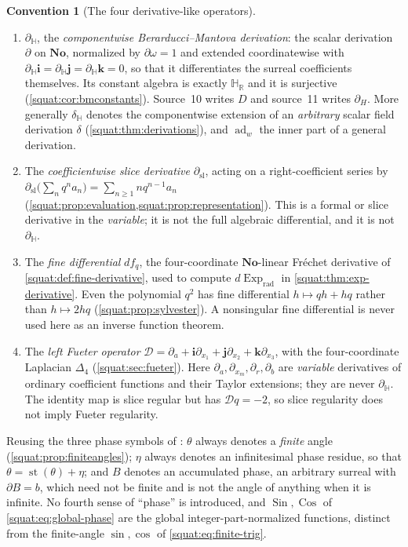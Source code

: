 \documentclass[11pt,letterpaper]{article}
\numberwithin{equation}{section}
\theoremstyle{definition}
\newtheorem{convention}[convention]{Convention}
\theoremstyle{remark}
\newcommand{\No}{\mathbf{No}}
\newcommand{\HR}{\mathbb H_{\mathbb R}}
\newcommand{\ii}{\mathbf i}
\newcommand{\jj}{\mathbf j}
\newcommand{\kk}{\mathbf k}
\newcommand{\st}{\operatorname{st}}
\newcommand{\ad}{\operatorname{ad}}
\newcommand{\Exp}{\operatorname{Exp}}
\newcommand{\Expr}{\Exp_{\mathrm{rad}}}
\newcommand{\Sin}{\operatorname{Sin}}
\newcommand{\Cos}{\operatorname{Cos}}
\newcommand{\DD}{\mathcal D}
\newcommand{\dsl}{\partial_{\mathrm{sl}}}
\newcommand{\dH}{\partial_{\mathbb H}}
\newcommand{\delH}{\delta_{\mathbb H}}
\begin{document}
\begin{convention}[The four derivative-like operators]\label{squat:conv:derivs}
\begin{enumerate}[label=\textup{(\alph*)},leftmargin=2.4em]
\item $\dH$, the \emph{componentwise Berarducci--Mantova derivation}: the scalar
derivation $\partial$ on $\No$, normalized by $\partial\omega=1$ and extended
coordinatewise with $\dH\ii=\dH\jj=\dH\kk=0$, so that it differentiates the surreal
coefficients themselves. Its
constant algebra is exactly $\HR$ and it is surjective
(\cref{squat:cor:bmconstants}). Source~10 writes $D$ and source~11 writes $\partial_H$.
More generally $\delH$ denotes the componentwise extension of an \emph{arbitrary} scalar
field derivation $\delta$ (\cref{squat:thm:derivations}), and $\ad_w$ the inner part of a
general derivation.
\item The \emph{coefficientwise slice derivative} $\dsl$, acting on a right-coefficient
series by $\dsl\bigl(\sum_n q^na_n\bigr)=\sum_{n\ge1}nq^{n-1}a_n$
(\cref{squat:prop:evaluation,squat:prop:representation}). This is a formal or slice
derivative in the \emph{variable}; it is not the full algebraic differential, and it is
not $\dH$.
\item The \emph{fine differential} $df_q$, the four-coordinate $\No$-linear
Fr\'echet derivative of \cref{squat:def:fine-derivative}, used to compute
$d\Expr$ in \cref{squat:thm:exp-derivative}. Even the polynomial $q^2$ has fine
differential $h\mapsto qh+hq$ rather than $h\mapsto2hq$
(\cref{squat:prop:sylvester}). A nonsingular fine differential is never used here as an
inverse function theorem.
\item The \emph{left Fueter operator} $\DD=\partial_a+\ii\partial_{x_1}+\jj\partial_{x_2}
+\kk\partial_{x_3}$, with the four-coordinate Laplacian $\Delta_4$
(\cref{squat:sec:fueter}). Here $\partial_a,\partial_{x_m},\partial_r,\partial_b$ are
\emph{variable} derivatives of ordinary coefficient functions and their Taylor
extensions; they are never $\dH$. The identity map is slice regular but has
$\DD q=-2$, so slice regularity does not imply Fueter regularity.
\end{enumerate}
\end{convention}

Reusing the three phase symbols of \cite{RepoDiff}: $\theta$ always denotes a
\emph{finite} angle (\cref{squat:prop:finiteangles}); $\eta$ always denotes an
infinitesimal phase residue, so that $\theta=\st(\theta)+\eta$; and $B$ denotes an
accumulated phase, an arbitrary surreal with $\partial B=b$, which need not be finite
and is not the angle of anything when it is infinite. No fourth sense of ``phase'' is
introduced, and $\Sin,\Cos$ of \cref{squat:eq:global-phase} are the global
integer-part-normalized functions, distinct from the finite-angle $\sin,\cos$ of
\cref{squat:eq:finite-trig}.
\end{document}
